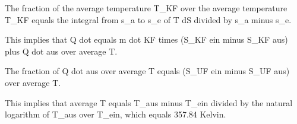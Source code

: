 The fraction of the average temperature T_KF over the average temperature T_KF equals the integral from s_a to s_e of T dS divided by s_a minus s_e.

This implies that Q dot equals m dot KF times (S_KF ein minus S_KF aus) plus Q dot aus over average T.

The fraction of Q dot aus over average T equals (S_UF ein minus S_UF aus) over average T.

This implies that average T equals T_aus minus T_ein divided by the natural logarithm of T_aus over T_ein, which equals 357.84 Kelvin.